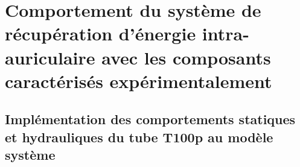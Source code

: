 

\lhead[\fancyplain{}{\leftmark}]%
      {\fancyplain{}{}} %
\chead[\fancyplain{}{}]%
      {\fancyplain{}{}}
\rhead[\fancyplain{}{}]%
      {\fancyplain{}{\rightmark}}%
\lfoot[\fancyplain{}{}]%
      {\fancyplain{}{}}
\cfoot[\fancyplain{}{\thepage}]%
      {\fancyplain{}{\thepage}} %
\rfoot[\fancyplain{}{}]%
     {\fancyplain{}{\scriptsize}}

\def \hfillx {\hspace*{ -\textwidth} \hfill} %

    					  					 

\chapter{Comportement du système de récupération d’énergie intra-auriculaire avec les composants caractérisés expérimentalement}
\label{ch:6_Comportement du systeme de recuperation d’energie intra-auriculaire avec les composants caracterises experimentalement}
 
\minitoc
\newpage
\section{Implémentation des comportements statiques et hydrauliques du tube T100p au modèle système}
\label{sec:6.1_Implémentation du comportement théorique des tubes flexibles au modèle système}
